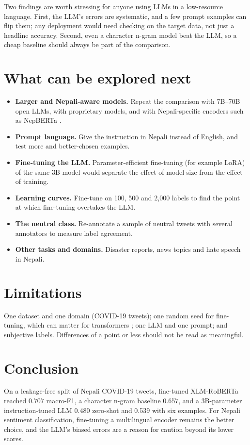 \documentclass[11pt,a4paper]{article}
\begin{document}
Two findings are worth stressing for anyone using LLMs in a low-resource language. First, the LLM's errors are systematic, and a few prompt examples can flip them; any deployment would need checking on the target data, not just a headline accuracy. Second, even a character n-gram model beat the LLM, so a cheap baseline should always be part of the comparison.

\section{What can be explored next}
\begin{itemize}
\item \textbf{Larger and Nepali-aware models.} Repeat the comparison with 7B--70B open LLMs, with proprietary models, and with Nepali-specific encoders such as NepBERTa \cite{timilsina2022}.
\item \textbf{Prompt language.} Give the instruction in Nepali instead of English, and test more and better-chosen examples.
\item \textbf{Fine-tuning the LLM.} Parameter-efficient fine-tuning (for example LoRA) of the same 3B model would separate the effect of model size from the effect of training.
\item \textbf{Learning curves.} Fine-tune on 100, 500 and 2,000 labels to find the point at which fine-tuning overtakes the LLM.
\item \textbf{The neutral class.} Re-annotate a sample of neutral tweets with several annotators to measure label agreement.
\item \textbf{Other tasks and domains.} Disaster reports, news topics and hate speech in Nepali.
\end{itemize}

\section{Limitations}
One dataset and one domain (COVID-19 tweets); one random seed for fine-tuning, which can matter for transformers \cite{dodge2020}; one LLM and one prompt; and subjective labels. Differences of a point or less should not be read as meaningful.

\section{Conclusion}
On a leakage-free split of Nepali COVID-19 tweets, fine-tuned XLM-RoBERTa reached 0.707 macro-F1, a character n-gram baseline 0.657, and a 3B-parameter instruction-tuned LLM 0.480 zero-shot and 0.539 with six examples. For Nepali sentiment classification, fine-tuning a multilingual encoder remains the better choice, and the LLM's biased errors are a reason for caution beyond its lower scores.
\end{document}

